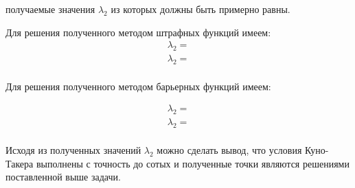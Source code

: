 \documentclass[12pt,a4paper,oneside]{report}
\begin{document}
получаемые значения $\lambda_{2}$ из которых должны быть примерно равны.

Для решения полученного методом штрафных функций имеем:
\begin{equation}
\begin{array}{rcl}  
\lambda_{2}  = \\  
\lambda_{2} = \\
\end{array}   
\end{equation}


Для решения полученного методом барьерных функций имеем:

\begin{equation}
\begin{array}{rcl}  
\lambda_{2}  = \\  
\lambda_{2} = \\
\end{array}   
\end{equation}

Исходя из полученных значений $\lambda_{2}$ можно сделать вывод, что условия Куно-Такера выполнены с точность до сотых и полученные точки являются решениями поставленной выше задачи.
\end{document}
